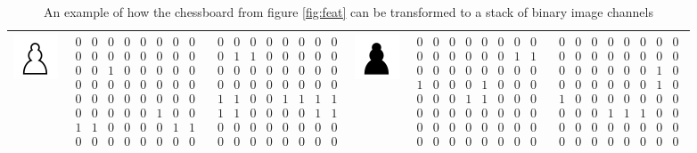 \begin{table}[]
\begin{tabular}{c c c | c c c}
\includegraphics[scale=0.5]{fig/pieces/P} &
$\begin{smallmatrix}0&0&0&0&0&0&0&0\\0&0&0&0&0&0&0&0\\0&0&1&0&0&0&0&0\\0&0&0&0&0&0&0&0\\0&0&0&0&0&0&0&0\\0&0&0&0&0&1&0&0\\1&1&0&0&0&0&1&1\\0&0&0&0&0&0&0&0\end{smallmatrix}$ &
$\begin{smallmatrix}0&0&0&0&0&0&0&0\\0&1&1&0&0&0&0&0\\0&0&0&0&0&0&0&0\\0&0&0&0&0&0&0&0\\1&1&0&0&1&1&1&1\\1&1&0&0&0&0&1&1\\0&0&0&0&0&0&0&0\\0&0&0&0&0&0&0&0\end{smallmatrix}$ &

\includegraphics[scale=0.5]{fig/pieces/p} &
$\begin{smallmatrix}0&0&0&0&0&0&0&0\\0&0&0&0&0&0&1&1\\0&0&0&0&0&0&0&0\\1&0&0&0&1&0&0&0\\0&0&0&1&1&0&0&0\\0&0&0&0&0&0&0&0\\0&0&0&0&0&0&0&0\\0&0&0&0&0&0&0&0\end{smallmatrix}$ &
$\begin{smallmatrix}0&0&0&0&0&0&0&0\\0&0&0&0&0&0&0&0\\0&0&0&0&0&0&1&0\\0&0&0&0&0&0&1&0\\1&0&0&0&0&0&0&0\\0&0&0&1&1&1&0&0\\0&0&0&0&0&0&0&0\\0&0&0&0&0&0&0&0\end{smallmatrix}$ \\

\bottomrule
\end{tabular}
\caption[Bitboards]{An example of how the chessboard from figure \ref{fig:feat} can be transformed to a stack of binary image channels}
\label{tab:feat}
\end{table}


